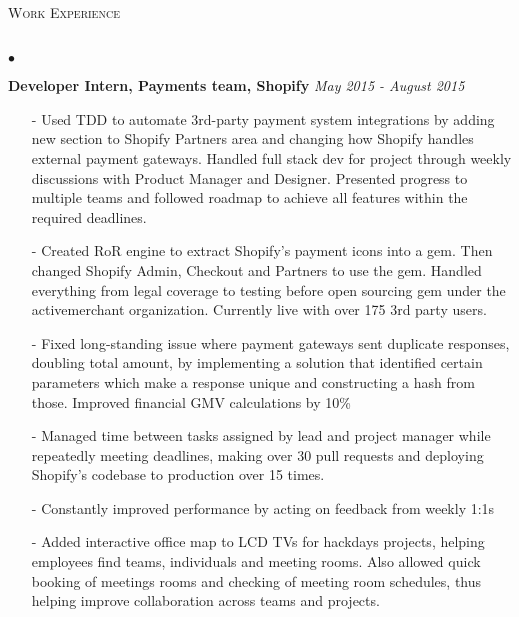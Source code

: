 \documentclass[10pt]{article}
\newcommand{\lineunder}{\vspace*{-8pt} \\ \hspace*{-18pt} \hrulefill \\}
\newcommand{\header}[1]{{\hspace*{-15pt}\vspace*{6pt} \textsc{#1}} \vspace*{-6pt} \lineunder}
\newenvironment{achievements}{\begin{list}{$\bullet$}{\topsep 0pt \itemsep -1.5pt \leftmargin 5pt}}{\vspace*{4pt}\end{list}}
\begin{document}
\header{\normalsize Work Experience}
\begin{achievements}
\item \textbf{Developer Intern, Payments team, Shopify} \hfill \textit {May 2015 - August 2015}
\begin{itemize}[leftmargin=0cm]
\item[-]Used TDD to automate 3rd-party payment system integrations by adding new section to Shopify Partners area and changing how Shopify handles external payment gateways. Handled full stack dev for project through weekly discussions with Product Manager and Designer. Presented progress to multiple teams and followed roadmap to achieve all features within the required deadlines.
\item[-]Created RoR engine to extract Shopify's payment icons into a gem. Then changed Shopify Admin, Checkout and Partners to use the gem. Handled everything from legal coverage to testing before open sourcing gem under the activemerchant organization. Currently live with over 175 3rd party users.
\item[-]Fixed long-standing issue where payment gateways sent duplicate responses, doubling total amount, by implementing a solution that identified certain parameters which make a response unique and constructing a hash from those. Improved financial GMV calculations by 10\%
\item[-]Managed time between tasks assigned by lead and project manager while repeatedly meeting deadlines, making over 30 pull requests and deploying Shopify's codebase to production over 15 times.
\item[-]Constantly improved performance by acting on feedback from weekly 1:1s
\item[-]Added interactive office map to LCD TVs for hackdays projects, helping employees find teams, individuals and meeting rooms. Also allowed quick booking of meetings rooms and checking of meeting room schedules, thus helping improve collaboration across teams and projects.
\end{itemize}
\end{achievements}

\vspace{6pt}
\end{document}
